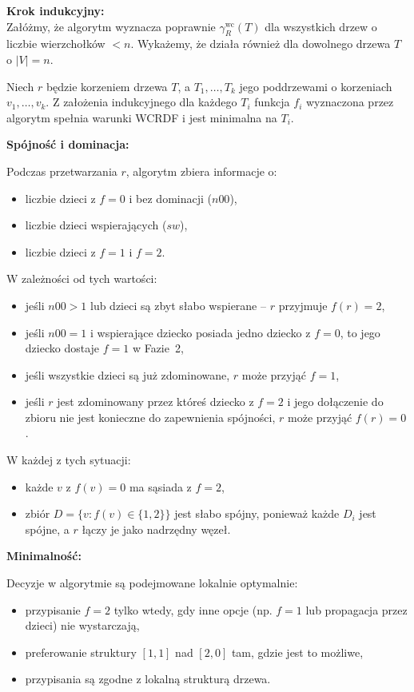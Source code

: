 \textbf{Krok indukcyjny:}\\ 
Załóżmy, że algorytm wyznacza poprawnie $\gamma_R^{\text{wc}}(T)$ dla wszystkich drzew o liczbie wierzchołków $< n$. Wykażemy, że działa również dla dowolnego drzewa $T$ o $|V| = n$.

Niech $r$ będzie korzeniem drzewa $T$, a $T_1, \dots, T_k$ jego poddrzewami o korzeniach $v_1, \dots, v_k$. Z założenia indukcyjnego dla każdego $T_i$ funkcja $f_i$ wyznaczona przez algorytm spełnia warunki WCRDF i jest minimalna na $T_i$.

\textbf{Spójność i dominacja:}

Podczas przetwarzania $r$, algorytm zbiera informacje o:
\begin{itemize}
\item liczbie dzieci z $f=0$ i bez dominacji ($n00$),
\item liczbie dzieci wspierających ($sw$),
\item liczbie dzieci z $f=1$ i $f=2$.
\end{itemize}

W zależności od tych wartości:
\begin{itemize}
\item jeśli $n00 > 1$ lub dzieci są zbyt słabo wspierane – $r$ przyjmuje $f(r) = 2$,
\item jeśli $n00 = 1$ i wspierające dziecko posiada jedno dziecko z $f=0$, to jego dziecko dostaje $f=1$ w Fazie~2,
\item jeśli wszystkie dzieci są już zdominowane, $r$ może przyjąć $f = 1$,
\item jeśli $r$ jest zdominowany przez któreś dziecko z $f = 2$ i jego dołączenie do zbioru nie jest konieczne do zapewnienia spójności, $r$ może przyjąć $f(r) = 0$.
\end{itemize}

W każdej z tych sytuacji:
\begin{itemize}
\item każde $v$ z $f(v)=0$ ma sąsiada z $f=2$,
\item zbiór $D = \{v : f(v) \in \{1,2\}\}$ jest słabo spójny, ponieważ każde $D_i$ jest spójne, a $r$ łączy je jako nadrzędny węzeł.
\end{itemize}

\textbf{Minimalność:}

Decyzje w algorytmie są podejmowane lokalnie optymalnie:
\begin{itemize}
\item przypisanie $f = 2$ tylko wtedy, gdy inne opcje (np. $f=1$ lub propagacja przez dzieci) nie wystarczają,
\item preferowanie struktury $[1,1]$ nad $[2,0]$ tam, gdzie jest to możliwe,
\item przypisania są zgodne z lokalną strukturą drzewa.
\end{itemize}

